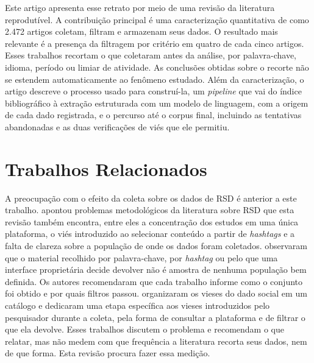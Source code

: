 \documentclass[11pt,a4paper]{article}
\begin{document}
Este artigo apresenta esse retrato por meio de uma revisão da literatura
reprodutível. A contribuição principal é uma caracterização quantitativa de como
2.472 artigos coletam, filtram e armazenam seus dados. O resultado mais
relevante é a presença da filtragem por critério em quatro de cada cinco
artigos. Esses trabalhos recortam o que coletaram antes da análise, por
palavra-chave, idioma, período ou limiar de atividade. As conclusões obtidas sobre o recorte não se estendem automaticamente ao fenômeno estudado. Além da
caracterização, o artigo descreve o processo usado para construí-la, um
\textit{pipeline} que vai do índice bibliográfico à extração estruturada com um
modelo de linguagem, com a origem de cada dado registrada, e o percurso até o
corpus final, incluindo as tentativas abandonadas e as duas verificações de viés
que ele permitiu.

\section{Trabalhos Relacionados}
\label{sec:relacionados}

A preocupação com o efeito da coleta sobre os dados de RSD é anterior a este
trabalho. \citet{tufekci2014bigquestions} apontou problemas metodológicos da literatura
sobre RSD que esta revisão também encontra, entre eles a concentração dos
estudos em uma única plataforma, o viés introduzido ao selecionar conteúdo a
partir de \textit{hashtags} e a falta de clareza sobre a população de onde os
dados foram coletados. \citet{ruths2014socialmedia} observaram que o material
recolhido por palavra-chave, por \textit{hashtag} ou pelo que uma interface
proprietária decide devolver não é amostra de nenhuma população bem definida. Os autores recomendaram que cada trabalho informe como o conjunto foi obtido e por quais
filtros passou. \citet{olteanu2019socialdata} organizaram os vieses do dado
social em um catálogo e dedicaram uma etapa específica aos vieses introduzidos
pelo pesquisador durante a coleta, pela forma de consultar a plataforma e de
filtrar o que ela devolve. Esses trabalhos discutem o problema e recomendam o
que relatar, mas não medem com que frequência a literatura recorta seus dados,
nem de que forma. Esta revisão procura fazer essa medição.
\end{document}
